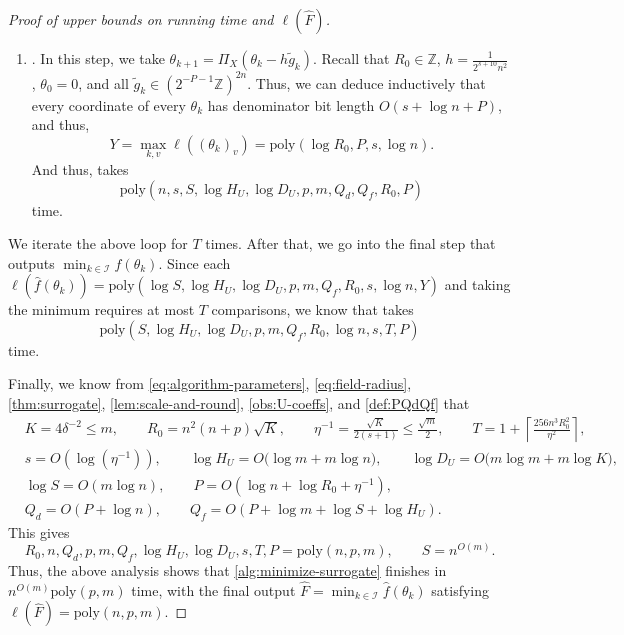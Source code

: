 \documentclass[11pt,reqno,letterpaper]{amsart}
\numberwithin{equation}{section}
\theoremstyle{definition}
\theoremstyle{remark}
\begin{document}
\begin{proof}[Proof of upper bounds on running time and $\ell(\widehat F)$]
\begin{enumerate}[leftmargin=*]
\begin{itemize}[leftmargin=*]
\end{itemize}

\noindent \textit{Correctness.} We have 
\begin{align*}
    |\widetilde f(\theta_k)-f(\theta_k)|\leq SH_U\omega_2=\frac{\epsilon_0}{2m}\leq \eta/4,
\end{align*}
and thus $f(\theta_k)\leq  \widehat  f(\theta_k)\leq f(\theta_k)+\eta/2$.

\item {}. In this step, we take $\theta_{k+1}=\Pi_X(\theta_k-h\widetilde g_k)$. Recall that $R_0\in\mathbb Z$, $h=\frac{1}{2^{s+10}n^2}$, $\theta_0=0$, and all  $\widetilde g_k\in  (2^{-P-1}\mathbb Z)^{2n}$. Thus, we can deduce inductively that every coordinate of every $\theta_{k}$ has denominator bit length $O(s+\log n+P)$, and thus,
\[
Y=\max_{k,v}\ell((\theta_k)_v)=\text{poly}(\log R_0,P,s,\log n).
\]
And thus,  takes
\[
\text{poly}(n,s,S,\log H_U,\log D_U,p,m,Q_d,Q_f,R_0,P)
\]
time.
\end{enumerate}

We iterate the above loop for  $T$ times. After that, we go into the final step     that outputs $\min_{k\in\mathcal I}\widehat f(\theta_k)$. 
Since  each $\ell(\widehat f(\theta_k))=\text{poly}(\log S,\log H_U,\log D_U,p,m,Q_f,R_0,s,\log n,Y)$ and taking the minimum requires at most $T$ comparisons, we know that 
takes $$\text{poly}(S,\log H_U,\log D_U,p,m,Q_f,R_0,\log n,s,T,P)$$ time.

Finally, we  know   from \cref{eq:algorithm-parameters}, \cref{eq:field-radius},  \cref{thm:surrogate}, \cref{lem:scale-and-round}, \cref{obs:U-coeffs}, and \cref{def:PQdQf} that
\begin{align*}
&K=4\delta^{-2}\leq m,\qquad R_0=n^2(n+p)\sqrt{K}, \qquad \eta^{-1}=\frac{\sqrt{K}}{2(s+1)}\leq\frac{\sqrt{m}}{2},\qquad
T=1+\left\lceil\frac{256n^3R_0^2}{\eta^2}\right\rceil,\\
&s  = O(\log(\eta^{-1})),\qquad 
\log H_U  = O\bigl(\log m+m\log n\bigr),\qquad 
\log D_U  = O\bigl(m\log m+m\log K\bigr),\\
&\log S  = O(m\log n),\qquad
P  = O(\log n+\log R_0+\eta^{-1}),\\
&Q_d  = O(P+\log n),\qquad
Q_f  = O(P+\log m+\log S+\log H_U).
\end{align*}
This gives
\[
R_0,n,Q_d,p,m,Q_f,\log H_U,\log D_U,s,T,P=\text{poly}(n,p,m),\qquad   S= n^{O(m)}.
\]
Thus, the above analysis shows that \cref{alg:minimize-surrogate} finishes in $n^{O(m)}\text{poly}(p,m)$ time, with the final output $\widehat F=\min_{k\in\mathcal I}\widehat f(\theta_k)$ satisfying $\ell(\widehat F)=\text{poly}(n,p,m)$.
\end{proof}
\end{document}
